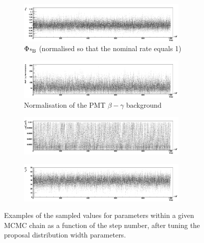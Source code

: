 \begin{figure}
    \centering
    \begin{subfigure}{0.98\textwidth}
        \centering
        \includegraphics[width=0.9\textwidth]{6_SolarAnalysis/images/beight_flux_vs_step_MCMC.png}
        \caption{$\Phi_{\beight{}}$ (normalised so that the nominal rate equals 1)}
        \label{fig:b8_flux_factor_vs_step}
    \end{subfigure}
    \begin{subfigure}{0.98\textwidth}
        \centering
        \includegraphics[width=0.9\textwidth]{6_SolarAnalysis/images/pmt_betagamma_vs_step_MCMC.png}
        \caption{Normalisation of the PMT $\beta-\gamma$ background}
        \label{fig:pmt_vs_step}
    \end{subfigure}
    \begin{subfigure}{0.98\textwidth}
        \centering
        \includegraphics[width=0.9\textwidth]{6_SolarAnalysis/images/dmsq_21_vs_step_MCMC.png}
        \caption{\dmsq{}}
        \label{fig:dmsq_21_vs_step}
    \end{subfigure}
    \begin{subfigure}{0.98\textwidth}
        \centering
        \includegraphics[width=0.9\textwidth]{6_SolarAnalysis/images/theta_12_vs_step_MCMC.png}
        \caption{\tonetwo{}}
        \label{fig:theta_12_vs_step}
    \end{subfigure}
    \caption{Examples of the sampled values for parameters within a given MCMC chain as a function of the step number, after tuning the proposal distribution width parameters.}
    \label{fig:params_vs_step_plots}
\end{figure}

